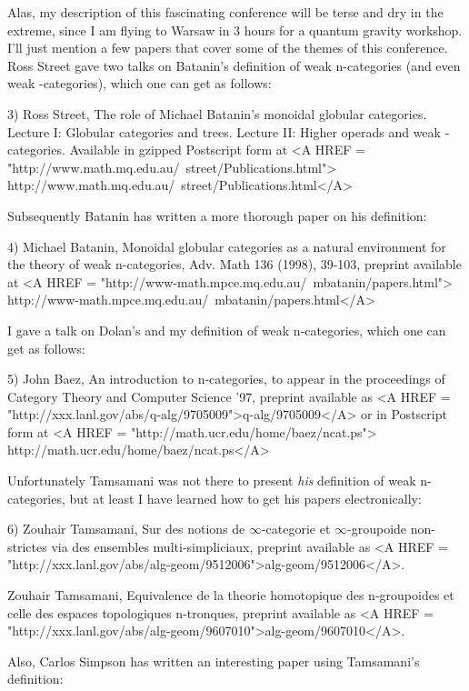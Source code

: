 Alas, my description of this fascinating conference will be terse
and dry in the extreme, since I am flying to Warsaw in 3 hours for
a quantum gravity workshop.  I'll just mention a few papers that
cover some of the themes of this conference.  Ross Street gave
two talks on Batanin's definition of weak n-categories (and even
weak \omega -categories), which one can get as follows:

3) Ross Street, The role of Michael Batanin's monoidal globular
categories.  Lecture I:  Globular categories and trees.  Lecture II: 
Higher operads and weak \omega -categories. Available in gzipped 
Postscript form at 
<A HREF = "http://www.math.mq.edu.au/~street/Publications.html">
http://www.math.mq.edu.au/~street/Publications.html</A>

Subsequently Batanin has written a more thorough paper on his
definition:

4) Michael Batanin, Monoidal globular categories as a natural
environment for the theory of weak n-categories, Adv. Math 136
(1998), 39-103, preprint available at
<A HREF = "http://www-math.mpce.mq.edu.au/~mbatanin/papers.html">
http://www-math.mpce.mq.edu.au/~mbatanin/papers.html</A>

I gave a talk on Dolan's and my definition of weak n-categories,
which one can get as follows:

5) John Baez, An introduction to n-categories, to appear in
the proceedings of Category Theory and Computer Science '97,
preprint available as <A HREF = "http://xxx.lanl.gov/abs/q-alg/9705009">q-alg/9705009</A> or in 
Postscript form at <A HREF = "http://math.ucr.edu/home/baez/ncat.ps">
http://math.ucr.edu/home/baez/ncat.ps</A>

Unfortunately Tamsamani was not there to present \emph{his} definition
of weak n-categories, but at least I have learned how to get his papers
electronically:

6) Zouhair Tamsamani, Sur des notions de $\infty$-categorie et 
$\infty$-groupoide non-strictes via des ensembles multi-simpliciaux, 
preprint available as 
<A HREF = "http://xxx.lanl.gov/abs/alg-geom/9512006">alg-geom/9512006</A>.

 
Zouhair Tamsamani, Equivalence de la theorie homotopique des 
n-groupoides et celle des espaces topologiques n-tronques, 
preprint available as 
<A HREF = "http://xxx.lanl.gov/abs/alg-geom/9607010">alg-geom/9607010</A>.

Also, Carlos Simpson has written an interesting paper using 
Tamsamani's definition:


